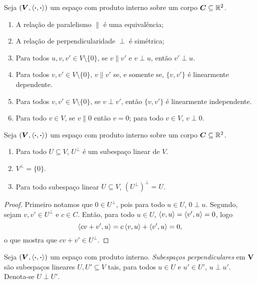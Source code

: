 \begin{proposition}
Seja $(\bm V,\left\langle{\bm{\cdot}},{\bm{\cdot}}\right\rangle)$ um espaço com produto interno sobre um corpo $\bm C \subseteq \mathbb{R}^2$.
	\begin{enumerate}
	\item A relação de paralelismo $\parallel$ é uma equivalência;
	\item A relação de perpendicularidade $\perp$ é simétrica;
	\item Para todos $u,v,v' \in V \setminus \{0\}$, se $v \parallel v'$ e $v \perp u$, então $v' \perp u$.
	\item Para todos $v,v' \in V \setminus \{0\}$, $v \parallel v'$ se, e somente se, $\{v,v'\}$ é linearmente dependente.
	\item Para todos $v,v' \in V \setminus \{0\}$, se $v \perp v'$, então $\{v,v'\}$ é linearmente independente.
	\item Para todo $v \in V$, se $v \parallel 0$ então $v=0$; para todo $v \in V$, $v \perp 0$.
	\end{enumerate}
\end{proposition}

\begin{proposition}
Seja $(\bm V,\left\langle{\bm{\cdot}},{\bm{\cdot}}\right\rangle)$ um espaço com produto interno sobre um corpo $\bm C \subseteq \mathbb{R}^2$.
	\begin{enumerate}
	\item Para todo $U \subseteq V$, $U^\perp$ é um subespaço linear de $V$.
	\item $V^\perp = \{0\}$.
	\item Para todo subespaço linear $U \subseteq V$, $(U^\perp)^\perp = U$.
	\end{enumerate}
\end{proposition}
\begin{proof}
Primeiro notamos que $0 \in U^\perp$, pois para todo $u \in U$, $0 \perp u$. Segundo, sejam $v,v' \in U^\perp$ e $c \in C$. Então, para todo $u \in U$, $\left\langle{v},{u}\right\rangle = \left\langle{v'},{u}\right\rangle = 0$, logo
	\begin{equation*}
	\left\langle{cv+v'},{u}\right\rangle = c\left\langle{v},{u}\right\rangle + \left\langle{v'},{u}\right\rangle = 0,
	\end{equation*}
o que mostra que $cv+v' \in U^\perp$.
\end{proof}

\begin{definition}
Seja $(\bm V,\left\langle{\bm{\cdot}},{\bm{\cdot}}\right\rangle)$ um espaço com produto interno. \emph{Subespaços perpendiculares} em $\bm V$ são subespaços lineares $U,U' \subseteq V$ tais, para todos $u \in U$ e $u' \in U'$, $u \perp u'$. Denota-se $U \perp U'$.
\end{definition}

